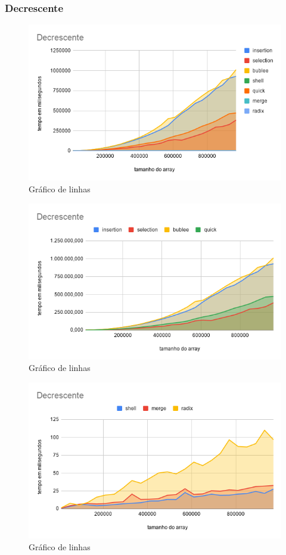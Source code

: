 \documentclass[a4paper, 12pt]{article}
\begin{document}
\subsubsection{Decrescente}
	\begin{figure}[!h]
	\caption{ Gráfico de linhas }
	\label{fig:decrescente1}
	\centering
	\includegraphics[width=1\textwidth, height=0.60\textwidth]{Decrescente}
	
\end{figure}
\begin{figure}[!h]
	\caption{ Gráfico de linhas }
	\label{fig:decrescente2}
	\centering
	\includegraphics[width=1\textwidth, height=0.57\textwidth]{Decrescente1}
\end{figure}

\begin{figure}[!h]
	\caption{ Gráfico de linhas }
	\label{fig:decrescente3}
	\centering
	\includegraphics[width=1\textwidth, height=0.57\textwidth]{Decrescente2}
\end{figure}
\newpage
\end{document}
